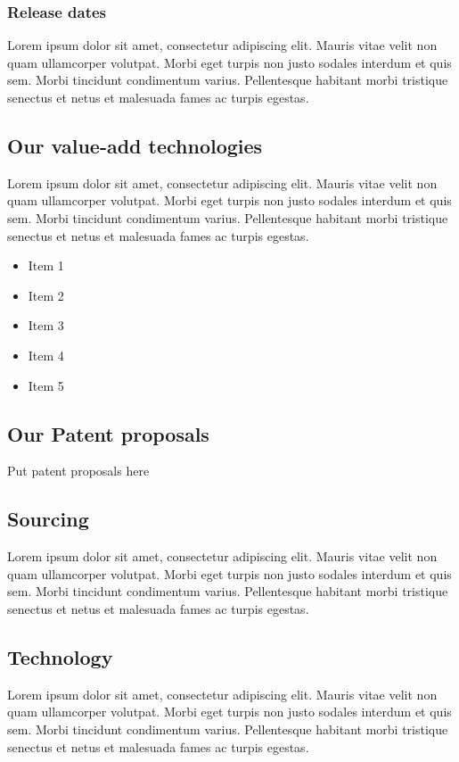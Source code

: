 \documentclass[11pt]{article}
\begin{document}
\subsubsection{Release dates}
Lorem ipsum dolor sit amet, consectetur adipiscing elit. Mauris vitae velit 
non quam ullamcorper volutpat. Morbi eget turpis non justo sodales interdum 
et quis sem. Morbi tincidunt condimentum varius. Pellentesque habitant morbi 
tristique senectus et netus et malesuada fames ac turpis egestas.\newline

\subsection{Our value-add technologies}
Lorem ipsum dolor sit amet, consectetur adipiscing elit. Mauris vitae velit 
non quam ullamcorper volutpat. Morbi eget turpis non justo sodales interdum 
et quis sem. Morbi tincidunt condimentum varius. Pellentesque habitant morbi 
tristique senectus et netus et malesuada fames ac turpis egestas.\newline
\begin{itemize}
\item Item 1
\item Item 2
\item Item 3
\item Item 4
\item Item 5
\end{itemize}

\subsection{Our Patent proposals}
Put patent proposals here\newline

\subsection{Sourcing}
Lorem ipsum dolor sit amet, consectetur adipiscing elit. Mauris vitae velit 
non quam ullamcorper volutpat. Morbi eget turpis non justo sodales interdum 
et quis sem. Morbi tincidunt condimentum varius. Pellentesque habitant morbi 
tristique senectus et netus et malesuada fames ac turpis egestas.\newline
\subsection{Technology}
Lorem ipsum dolor sit amet, consectetur adipiscing elit. Mauris vitae velit 
non quam ullamcorper volutpat. Morbi eget turpis non justo sodales interdum 
et quis sem. Morbi tincidunt condimentum varius. Pellentesque habitant morbi 
tristique senectus et netus et malesuada fames ac turpis egestas.\newline
\end{document}

